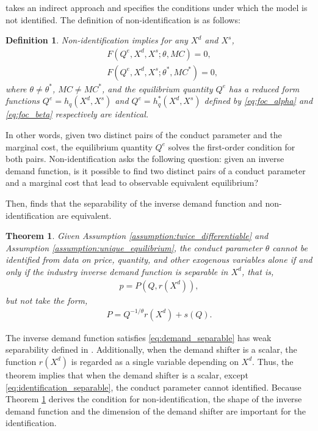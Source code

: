 \documentclass[11pt, a4paper]{article}
\newtheorem{theorem}{Theorem}
\newtheorem{definition}{Definition}
\theoremstyle{remark}
\begin{document}
\citet{lau1982identifying} takes an indirect approach and specifies the conditions under which the model is not identified.
The definition of non-identification is as follows:
\begin{definition}\label{def:non_identification}
    Non-identification implies for any $X^{d}$ and $X^{s}$,
    \begin{align}
    & F(Q^e, X^{d}, X^{s}; \theta, MC) = 0,  \label{eq:foc_alpha}\\
    & F(Q^e, X^{d}, X^{s}; \theta^{*}, MC^{*}) = 0,\label{eq:foc_beta}
    \end{align}
    where $\theta \neq \theta^{*}$, $MC \ne MC^{*}$, and the equilibrium quantity $Q^e$ has a reduced form functions $Q^e = h_q(X^{d}, X^{s})$ and $Q^e = h_q^{*}(X^{d}, X^{s})$ defined by \eqref{eq:foc_alpha} and \eqref{eq:foc_beta} respectively are identical.
\end{definition}
In other words, given two distinct pairs of the conduct parameter and the marginal cost, the equilibrium quantity $Q^e$ solves the first-order condition for both pairs.
Non-identification asks the following question: given an inverse demand function, is it possible to find two distinct pairs of a conduct parameter and a marginal cost that lead to observable equivalent equilibrium?

Then, \citet{lau1982identifying} finds that the separability of the inverse demand function and non-identification are equivalent.
\begin{theorem}\label{theorem_lau}
    Given Assumption \ref{assumption:twice_differentiable} and Assumption \ref{assumption:unique_equilibrium},
    the conduct parameter $\theta$ cannot be identified from data on price, quantity, and other exogenous variables alone if and only if the industry inverse demand function is separable in $X^{d}$, that is,
    \begin{align}
        p = P(Q, r(X^{d})), \label{eq:demand_separable}
    \end{align}
    but not take the form, 
    \begin{align}
        P = Q^{-1/\theta}r(X^{d}) + s(Q). \label{eq:identification_separable}
    \end{align}
\end{theorem}
The inverse demand function satisfies \eqref{eq:demand_separable} has weak separability defined in \citet{goldmanNote1964}.
Additionally, when the demand shifter is a scalar, the function $r(X^{d})$ is regarded as a single variable depending on $X^{d}$.
Thus, the theorem implies that when the demand shifter is a scalar, except \eqref{eq:identification_separable}, the conduct parameter cannot identified.
Because Theorem \ref{theorem_lau} derives the condition for non-identification, the shape of the inverse demand function and the dimension of the demand shifter are important for the identification.
\end{document}

